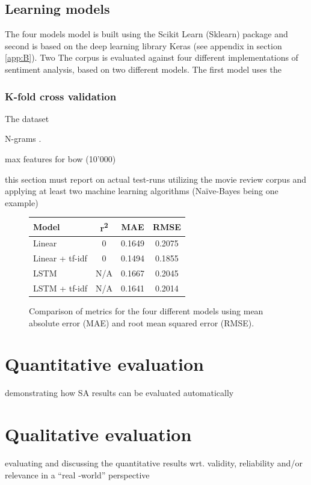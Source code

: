 \documentclass[a4paper]{article}
\begin{document}
\subsection{Learning models}
The four models model is built using the Scikit Learn (Sklearn) package and second
is based on the deep learning library Keras (see appendix in section \ref{app:B}).
Two The corpus is evaluated against four different implementations of
sentiment analysis, based on two different models. The first model uses the

\subsubsection{K-fold cross validation}
The dataset

N-grams \cite{Jurafsky2000}.

max features for bow (10'000)

this section must
report on actual test-runs utilizing the movie review corpus and applying at least two
machine learning algorithms (Naïve-Bayes being one example)

\begin{figure}
  \begin{centering}
    \begin{tabular}{ l c c c }
      \textbf{Model} & \textbf{r\textsuperscript{2}} & \textbf{MAE} & \textbf{RMSE} \\ \hline
      Linear          & 0   & 0.1649 & 0.2075 \\
      Linear + tf-idf & 0   & 0.1494 & 0.1855 \\
      LSTM            & N/A & 0.1667 & 0.2045 \\
      LSTM + tf-idf   & N/A & 0.1641 & 0.2014
    \end{tabular}
    \caption{Comparison of metrics for the four different models using mean absolute error (MAE) and root mean squared error (RMSE).}
  \end{centering}
\end{figure}

\section{Quantitative evaluation}
demonstrating how SA results can be evaluated
automatically

\section{Qualitative evaluation}
evaluating and discussing the quantitative results wrt.
validity, reliability and/or relevance in a “real
-world” perspective
\end{document}
